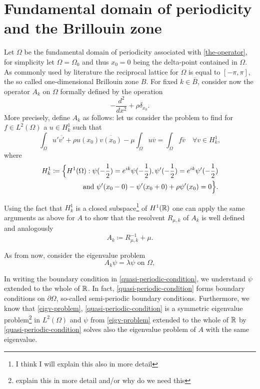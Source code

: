 \chapter{Fundamental domain of periodicity and the Brillouin zone}

Let $\Omega$ be the fundamental domain of periodicity associated with \eqref{the-operator}, for simplicity let $\Omega = \Omega_{0}$ and thus $x_{0} = 0$ being the delta-point contained in $\Omega$. As commonly used by literature the reciprocal lattice for $\Omega$ is equal to $[-\pi, \pi]$, the so called one-dimensional Brillouin zone $B$. For fixed $k \in \overline{B}$, consider now the operator $A_{k}$ on $\Omega$ formally defined by the operation
		\[ -\frac{d^{2}}{dx^{2}} + \rho \delta_{x_{0}}. \]
	More precisely, define $A_{k}$ as follows: let us consider the problem to find for $f \in L^{2}(\Omega)$ a $u \in H^{1}_{k}$ such that
	\[ \int_{\Omega} u' \overline{v'} + \rho u(x_{0}) \overline{v(x_{0})} - \mu \int_{\Omega} u \overline{v} = \int_{\Omega} f \overline{v} \quad \forall v \in H^{1}_{k}, \]
	where 
	\begin{eqnarray}
		H^{1}_{k} \coloneqq \Big\{ H^{1}(\Omega): \psi(-\frac{1}{2}) = e^{ik} \psi(-\frac{1}{2}), \psi'(-\frac{1}{2}) = e^{ik} \psi'(-\frac{1}{2}) \notag \\ ~\quad \text{ and } \psi'(x_{0} - 0) - \psi'(x_{0} + 0) + \rho \psi'(x_{0}) = 0 \Big\}. \label{quasi-periodic-condition}	
	\end{eqnarray}

 	Using the fact that $H^{1}_{k}$ is a closed subspace\footnote{I think I will explain this also in more detail} of $H^{1}(\mathbb{R})$ one can apply the same arguments as above for $A$ to show that the resolvent $R_{\mu, k}$ of $A_{k}$ is well defined and analogously
		\[ A_{k} \coloneqq R_{\mu, k}^{-1} + \mu. \] 
		
	As from now, consider the eigenvalue problem
	\begin{equation}
		A_{k} \psi = \lambda \psi \text{ on } \Omega, \label{eigv-problem}
	\end{equation}

	In writing the boundary condition in \eqref{quasi-periodic-condition}, we understand $\psi$ extended to the whole of $\mathbb{R}$. In fact, \eqref{quasi-periodic-condition} forms boundary conditions on $\partial \Omega$, so-called semi-periodic boundary conditions. Furthermore, we know that \eqref{eigv-problem}, \eqref{quasi-periodic-condition} is a symmetric eigenvalue problem\footnote{explain this in more detail and/or why do we need this} in $L^{2}(\Omega)$ and $\psi$ from \eqref{eigv-problem} extended to the whole of $\mathbb{R}$ by \eqref{quasi-periodic-condition} solves also the eigenvalue problem of $A$ with the same eigenvalue. \\
	
